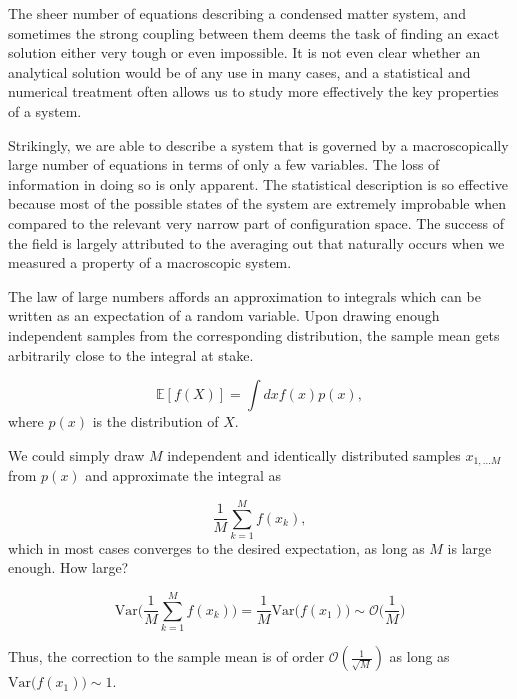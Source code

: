 The sheer number of equations describing a condensed matter system, and sometimes the strong coupling between them deems the task of finding an exact solution either very tough or even impossible.
It is not even clear whether an analytical solution would be of any use in many cases, and a statistical and numerical treatment often allows us to study more effectively the key properties of a system.

Strikingly, we are able to describe a system that is governed by a macroscopically large number of equations in terms of only a few variables.
The loss of information in doing so is only apparent.
The statistical description is so effective because most of the possible states of the system are extremely improbable when compared to the relevant very narrow part of configuration space.
The success of the field is largely attributed to the averaging out that naturally occurs when we measured a property of a macroscopic system.

The law of large numbers affords an approximation to integrals which can be written as an expectation of a random variable. Upon drawing enough independent samples from the corresponding distribution, the sample mean gets arbitrarily close to the integral at stake.

\begin{equation}\label{eq:int_mean}
\mathbb{E} [f(X)] = \int dx f(x) p(x),
\end{equation}
where $p(x)$ is the distribution of $X$. 

We could simply draw $M$ independent and identically distributed samples $x_{1,...M}$ from $p(x)$ and approximate the integral as

\begin{equation}
\frac{1}{M} \sum_{k=1}^M f (x_k) , 
\end{equation}
which in most cases converges to the desired expectation, as long as $M$ is large enough. How large?

\begin{equation}\label{eq:variance}
\text{Var}\bigg( \frac{1}{M} \sum_{k=1}^M f(x_k) \bigg) = \frac{1}{M} \text{Var}\bigg( f(x_1) \bigg) \sim \mathcal{O}\bigg(\frac{1}{M}\bigg)
\end{equation}

Thus, the correction to the sample mean is of order $\mathcal{O}(\frac{1}{\sqrt{M}})$ as long as $\text{Var}\big( f(x_1) \big) \sim 1$.

